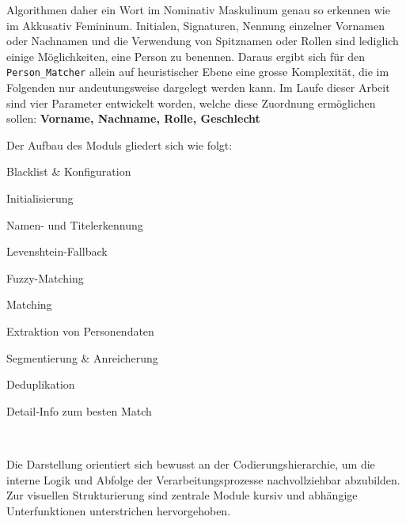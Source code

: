 \documentclass[12pt, a4paper, ngerman, bidi=default]{article}
\newcommand{\code}[1]{\colorbox{VeryLightGray}{\texttt{#1}}} %
\begin{document}
Algorithmen daher ein Wort im Nominativ Maskulinum genau so erkennen wie im Akkusativ Femininum. Initialen, Signaturen, Nennung einzelner Vornamen oder Nachnamen und die Verwendung von Spitznamen oder Rollen sind lediglich einige Möglichkeiten, eine Person zu benennen. Daraus ergibt sich für den \code{Person\_Matcher} allein auf heuristischer Ebene eine grosse Komplexität, die im Folgenden nur andeutungsweise dargelegt werden kann. 
Im Laufe dieser Arbeit sind vier Parameter entwickelt worden, welche diese Zuordnung ermöglichen sollen:
\textbf{Vorname,
Nachname,
Rolle,
Geschlecht} \\
\begin{samepage}
Der Aufbau des Moduls gliedert sich wie folgt:\\[0.5em]
\begin{minipage}[t]{0.45\textwidth}
  \justifying
  \begin{enumerate}\small{
    \item Blacklist \& Konfiguration 
    \item Initialisierung
    \item Namen- und Titelerkennung
    \item Levenshtein-Fallback
    \item Fuzzy-Matching}
  \end{enumerate}
\end{minipage}
\hfill
\begin{minipage}[t]{0.48\textwidth}
  \vspace*{0cm}
  \justifying
  \begin{enumerate}
    \setcounter{enumi}{5}
    \small{
    \item Matching
    \item Extraktion von Personendaten
    \item Segmentierung \& Anreicherung
    \item Deduplikation 
    \item Detail‑Info zum besten Match}
  \end{enumerate}
\end{minipage}
\vspace*{0.5cm}\\
\end{samepage}

Die Darstellung orientiert sich bewusst an der Codierungshierarchie, um die interne Logik und Abfolge der Verarbeitungsprozesse nachvollziehbar abzubilden. Zur visuellen Strukturierung sind zentrale Module kursiv und abhängige Unterfunktionen unterstrichen hervorgehoben.
\end{document}
